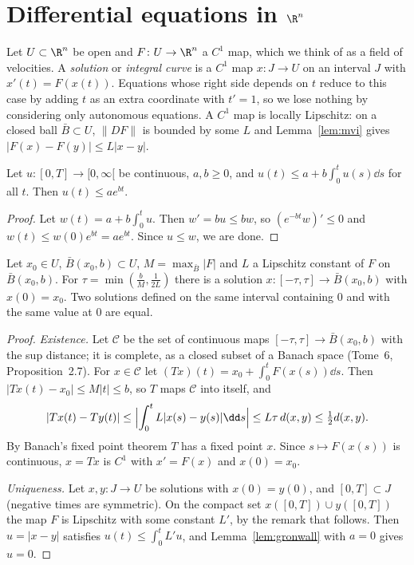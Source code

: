 \section{Differential equations in \texorpdfstring{$\R^n$}{R\^{}n}}

Let $U\subset\R^n$ be open and $F\colon U\to\R^n$ a $C^1$ map, which we think of as a field of velocities. A \emph{solution} or \emph{integral curve}
is a $C^1$ map $x\colon J\to U$ on an interval $J$ with $x'(t)=F(x(t))$. Equations whose right side depends on $t$ reduce to this case by adding $t$ as
an extra coordinate with $t'=1$, so we lose nothing by considering only autonomous equations. A $C^1$ map is locally Lipschitz: on a closed ball
$\bar B\subset U$, $\|DF\|$ is bounded by some $L$ and Lemma~\ref{lem:mvi} gives $|F(x)-F(y)|\le L|x-y|$.

\begin{lemma}[Gr\"onwall]\label{lem:gronwall}
Let $u\colon[0,T]\to[0,\infty[$ be continuous, $a,b\ge0$, and $u(t)\le a+b\int_0^tu(s)\dd s$ for all $t$. Then $u(t)\le ae^{bt}$.
\end{lemma}
\begin{proof}
Let $w(t)=a+b\int_0^tu$. Then $w'=bu\le bw$, so $(e^{-bt}w)'\le0$ and $w(t)\le w(0)e^{bt}=ae^{bt}$. Since $u\le w$, we are done.
\end{proof}

\begin{theorem}\label{thm:picard}
Let $x_0\in U$, $\bar B(x_0,b)\subset U$, $M=\max_{\bar B}|F|$ and $L$ a Lipschitz constant of $F$ on $\bar B(x_0,b)$. For $\tau=\min(\frac bM,\frac1{2L})$
there is a solution $x\colon[-\tau,\tau]\to\bar B(x_0,b)$ with $x(0)=x_0$. Two solutions defined on the same interval containing $0$ and with the same value
at $0$ are equal.
\end{theorem}
\begin{proof}
\emph{Existence.} Let $\mathcal C$ be the set of continuous maps $[-\tau,\tau]\to\bar B(x_0,b)$ with the sup distance; it is complete, as a closed subset of
a Banach space (Tome~6, Proposition~2.7). For $x\in\mathcal C$ let $(Tx)(t)=x_0+\int_0^tF(x(s))\dd s$. Then $|Tx(t)-x_0|\le M|t|\le b$, so $T$ maps
$\mathcal C$ into itself, and
\[
|Tx(t)-Ty(t)|\le\Bigl|\int_0^tL|x(s)-y(s)|\dd s\Bigr|\le L\tau\,d(x,y)\le\tfrac12d(x,y).
\]
By Banach's fixed point theorem $T$ has a fixed point $x$. Since $s\mapsto F(x(s))$ is continuous, $x=Tx$ is $C^1$ with $x'=F(x)$ and $x(0)=x_0$.

\emph{Uniqueness.} Let $x,y\colon J\to U$ be solutions with $x(0)=y(0)$, and $[0,T]\subset J$ (negative times are symmetric). On the compact set
$x([0,T])\cup y([0,T])$ the map $F$ is Lipschitz with some constant $L'$, by the remark that follows. Then $u=|x-y|$ satisfies $u(t)\le\int_0^tL'u$, and Lemma~\ref{lem:gronwall} with $a=0$ gives $u=0$.
\end{proof}

